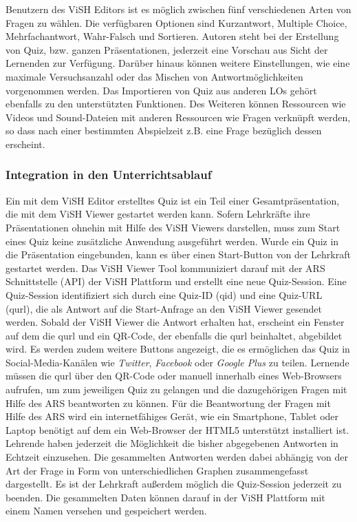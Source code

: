 \documentclass[conference]{IEEEtran}
\begin{document}
Benutzern des ViSH Editors ist es möglich zwischen fünf verschiedenen Arten von Fragen zu wählen. Die verfügbaren Optionen sind Kurzantwort, Multiple Choice, Mehrfachantwort, Wahr-Falsch und Sortieren. Autoren steht bei der Erstellung von Quiz, bzw. ganzen Präsentationen, jederzeit eine Vorschau aus Sicht der Lernenden zur Verfügung. Darüber hinaus können weitere Einstellungen, wie eine maximale Versuchsanzahl oder das Mischen von Antwortmöglichkeiten vorgenommen werden. Das Importieren von Quiz aus anderen LOs gehört ebenfalls zu den unterstützten Funktionen. Des Weiteren können Ressourcen wie Videos und Sound-Dateien mit anderen Ressourcen wie Fragen verknüpft werden, so dass nach einer bestimmten Abspielzeit z.B. eine Frage bezüglich dessen erscheint. \cite[S. 3f]{Gordillo2015}
\\
\subsubsection{Integration in den Unterrichtsablauf}
Ein mit dem ViSH Editor erstelltes Quiz ist ein Teil einer Gesamtpräsentation, die mit dem ViSH Viewer gestartet werden kann. Sofern Lehrkräfte ihre Präsentationen ohnehin mit Hilfe des ViSH Viewers darstellen, muss zum Start eines Quiz keine zusätzliche Anwendung ausgeführt werden. Wurde ein Quiz in die Präsentation eingebunden, kann es über einen Start-Button von der Lehrkraft gestartet werden. Das ViSH Viewer Tool kommuniziert darauf mit der ARS Schnittstelle (API) der ViSH Plattform und erstellt eine neue Quiz-Session. Eine Quiz-Session identifiziert sich durch eine Quiz-ID (qid) und eine Quiz-URL (qurl), die als Antwort auf die Start-Anfrage an den ViSH Viewer gesendet werden. Sobald der ViSH Viewer die Antwort erhalten hat, erscheint ein Fenster auf dem die qurl und ein QR-Code, der ebenfalls die qurl beinhaltet, abgebildet wird. Es werden zudem weitere Buttons angezeigt, die es ermöglichen das Quiz in Social-Media-Kanälen wie \emph{Twitter}, \emph{Facebook} oder \emph{Google Plus} zu teilen. Lernende müssen die qurl über den QR-Code oder manuell innerhalb eines Web-Browsers aufrufen, um zum jeweiligen Quiz zu gelangen und die dazugehörigen Fragen mit Hilfe des ARS beantworten zu können. Für die Beantwortung der Fragen mit Hilfe des ARS wird ein internetfähiges Gerät, wie ein Smartphone, Tablet oder Laptop benötigt auf dem ein Web-Browser der HTML5 unterstützt installiert ist. Lehrende haben jederzeit die Möglichkeit die bisher abgegebenen Antworten in Echtzeit einzusehen. Die gesammelten Antworten werden dabei abhängig von der Art der Frage in Form von unterschiedlichen Graphen zusammengefasst dargestellt. Es ist der Lehrkraft außerdem möglich die Quiz-Session jederzeit zu beenden. Die gesammelten Daten können darauf in der ViSH Plattform mit einem Namen versehen und gespeichert werden. \cite[S. 6f]{Gordillo2015}
\\
\end{document}
